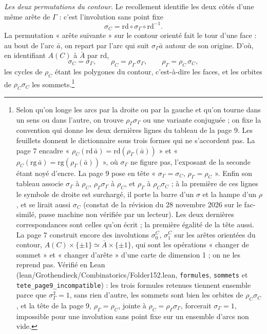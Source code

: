 \documentclass[11pt,a4paper]{article}
\begin{document}
\emph{Les deux permutations du contour.} Le recollement identifie les deux côtés
d'une même arête de $\Gamma$ : c'est l'involution sans point fixe
\[
\sigma_{C} = \mathrm{rd} \circ \sigma_{\Gamma} \circ \mathrm{rd}^{-1}.
\]
La permutation « arête suivante » sur le contour orienté fait le tour d'une
face : au bout de l'arc $\bar{a}$, on repart par l'arc qui suit $\sigma_{\Gamma}
\bar{a}$ autour de son origine. D'où, en identifiant $A(C)$ à $\bar{A}$ par
$\mathrm{rd}$,
\[
\sigma_{C} = \sigma_{\Gamma}, \qquad
\rho_{C} = \rho_{\Gamma}\,\sigma_{\Gamma}, \qquad
\rho_{\Gamma} = \rho_{C}\,\sigma_{C},
\]
les cycles de $\rho_{C}$ étant les polygones du contour, c'est-à-dire les faces,
et les orbites de $\rho_{C}\sigma_{C}$ les sommets.\footnote{Selon qu'on longe
les arcs par la droite ou par la gauche et qu'on tourne dans un sens ou dans
l'autre, on trouve $\rho_{\Gamma}\sigma_{\Gamma}$ ou une variante conjuguée ; on
fixe la convention qui donne les deux dernières lignes du tableau de la page 9.
Les feuillets donnent le dictionnaire sous trois formes qui ne s'accordent pas.
La page 7 encadre « $\rho_{C}(\mathrm{rd}\,\bar{a}) =
\mathrm{rd}(\rho_{\Gamma}(\bar{a}))$ » et « $\rho_{C}(\mathrm{rg}\,\bar{a}) =
\mathrm{rg}(\rho_{\Gamma}(\bar{a}))$ », où $\sigma_{\Gamma}$ ne figure pas,
l'exposant de la seconde étant noyé d'encre. La page 9 pose en tête
« $\sigma_{\Gamma} = \sigma_{C}$, $\rho_{\Gamma} = \rho_{C}$ ». Enfin son tableau
associe $\sigma_{\Gamma}$ à $\rho_{C}$, $\rho_{\Gamma}\sigma_{\Gamma}$ à
$\rho_{C}$, et $\rho_{\Gamma}$ à $\rho_{C}\sigma_{C}$ ; à la première de ces
lignes le symbole de droite est surchargé, il porte la barre d'un $\sigma$ et
la hampe d'un $\rho$, et se lirait aussi $\sigma_{C}$ (constat de la
révision du 28 novembre 2026 sur le fac-similé, passe machine non vérifiée par un lecteur). Les deux dernières
correspondances sont celles qu'on écrit ; la première égalité de la tête aussi.
La page 7 construit encore des involutions $\sigma^{C}_{0}$, $\sigma^{C}_{1}$ sur
les arêtes orientées du contour, $A(C) \times \{\pm 1\} \simeq \bar{A} \times
\{\pm 1\}$, qui sont les opérations « changer de sommet » et « changer d'arête »
d'une carte de dimension 1 ; on ne les reprend pas. Vérifié en Lean
(lean/Grothendieck/Combinatorics/Folder152.lean, \texttt{formules}, \texttt{sommets} et
\texttt{tete\_page9\_incompatible}) : les trois formules retenues tiennent
ensemble parce que $\sigma_{\Gamma}^{2} = 1$, sans rien d'autre, les sommets
sont bien les orbites de $\rho_{C}\sigma_{C}$, et la tête de la page 9,
$\rho_{\Gamma} = \rho_{C}$, jointe à $\rho_{C} = \rho_{\Gamma}\sigma_{\Gamma}$,
forcerait $\sigma_{\Gamma} = 1$, impossible pour une involution sans point fixe
sur un ensemble d'arcs non vide.}
\end{document}
